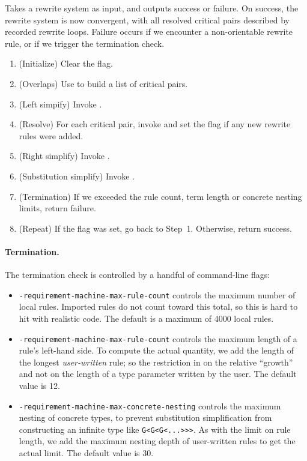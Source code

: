 \documentclass[../generics]{subfiles}
\begin{document}
\begin{algorithm}\label{knuthbendix} Takes a rewrite system as input, and outputs success or failure. On success, the rewrite system is now convergent, with all resolved critical pairs described by recorded rewrite loops. Failure occurs if we encounter a non-orientable rewrite rule, or if we trigger the termination check.
\begin{enumerate}
\item (Initialize) Clear the flag.
\item (Overlaps) Use  to build a list of critical pairs.
\item (Left simpify) Invoke .
\item (Resolve) For each critical pair, invoke  and set the flag if any new rewrite rules were added.
\item (Right simplify) Invoke .
\item (Substitution simplify) Invoke .
\item (Termination) If we exceeded the rule count, term length or concrete nesting limits, return failure.
\item (Repeat) If the flag was set, go back to Step~1. Otherwise, return success.
\end{enumerate}
\end{algorithm}

\paragraph{Termination.} The termination check is controlled by a handful of command-line flags:
\begin{itemize}
\item {} \texttt{-requirement-machine-max-rule-count} controls the maximum number of local rules. Imported rules do not count toward this total, so this is hard to hit with realistic code. The default is a maximum of 4000 local rules.

\item {} \texttt{-requirement-machine-max-rule-count} controls the maximum length of a rule's left-hand side. To compute the actual quantity, we add the length of the longest \emph{user-written} rule; so the restriction in on the relative ``growth'' and not on the length of a type parameter written by the user. The default value is 12.

\item {} \texttt{-requirement-machine-max-concrete-nesting} controls the maximum nesting of concrete types, to prevent substitution simplification from constructing an infinite type like \texttt{G<G<G<...>>>}. As with the limit on rule length, we add the maximum nesting depth of user-written rules to get the actual limit. The default value is 30.
\end{itemize}
\end{document}
